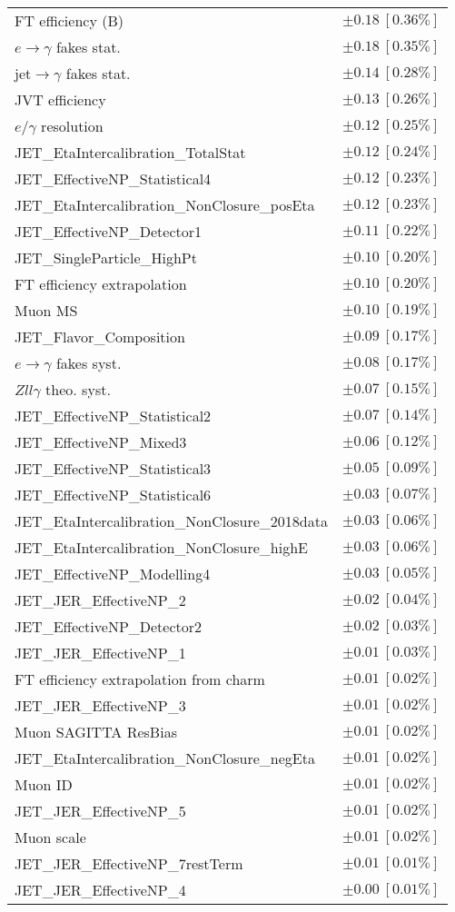 \begin{tabular}{lr}
FT efficiency (B) & $\pm 0.18\ [0.36\%]$ \\
$e\to\gamma$ fakes stat. & $\pm 0.18\ [0.35\%]$ \\
jet$\to\gamma$ fakes stat. & $\pm 0.14\ [0.28\%]$ \\
JVT efficiency & $\pm 0.13\ [0.26\%]$ \\
$e/\gamma$ resolution & $\pm 0.12\ [0.25\%]$ \\
JET\_EtaIntercalibration\_TotalStat & $\pm 0.12\ [0.24\%]$ \\
JET\_EffectiveNP\_Statistical4 & $\pm 0.12\ [0.23\%]$ \\
JET\_EtaIntercalibration\_NonClosure\_posEta & $\pm 0.12\ [0.23\%]$ \\
JET\_EffectiveNP\_Detector1 & $\pm 0.11\ [0.22\%]$ \\
JET\_SingleParticle\_HighPt & $\pm 0.10\ [0.20\%]$ \\
FT efficiency extrapolation & $\pm 0.10\ [0.20\%]$ \\
Muon MS & $\pm 0.10\ [0.19\%]$ \\
JET\_Flavor\_Composition & $\pm 0.09\ [0.17\%]$ \\
$e\to\gamma$ fakes syst. & $\pm 0.08\ [0.17\%]$ \\
$Zll\gamma$ theo. syst. & $\pm 0.07\ [0.15\%]$ \\
JET\_EffectiveNP\_Statistical2 & $\pm 0.07\ [0.14\%]$ \\
JET\_EffectiveNP\_Mixed3 & $\pm 0.06\ [0.12\%]$ \\
JET\_EffectiveNP\_Statistical3 & $\pm 0.05\ [0.09\%]$ \\
JET\_EffectiveNP\_Statistical6 & $\pm 0.03\ [0.07\%]$ \\
JET\_EtaIntercalibration\_NonClosure\_2018data & $\pm 0.03\ [0.06\%]$ \\
JET\_EtaIntercalibration\_NonClosure\_highE & $\pm 0.03\ [0.06\%]$ \\
JET\_EffectiveNP\_Modelling4 & $\pm 0.03\ [0.05\%]$ \\
JET\_JER\_EffectiveNP\_2 & $\pm 0.02\ [0.04\%]$ \\
JET\_EffectiveNP\_Detector2 & $\pm 0.02\ [0.03\%]$ \\
JET\_JER\_EffectiveNP\_1 & $\pm 0.01\ [0.03\%]$ \\
FT efficiency extrapolation from charm & $\pm 0.01\ [0.02\%]$ \\
JET\_JER\_EffectiveNP\_3 & $\pm 0.01\ [0.02\%]$ \\
Muon SAGITTA ResBias & $\pm 0.01\ [0.02\%]$ \\
JET\_EtaIntercalibration\_NonClosure\_negEta & $\pm 0.01\ [0.02\%]$ \\
Muon ID & $\pm 0.01\ [0.02\%]$ \\
JET\_JER\_EffectiveNP\_5 & $\pm 0.01\ [0.02\%]$ \\
Muon scale & $\pm 0.01\ [0.02\%]$ \\
JET\_JER\_EffectiveNP\_7restTerm & $\pm 0.01\ [0.01\%]$ \\
JET\_JER\_EffectiveNP\_4 & $\pm 0.00\ [0.01\%]$ \\
\hline
\end{tabular}
